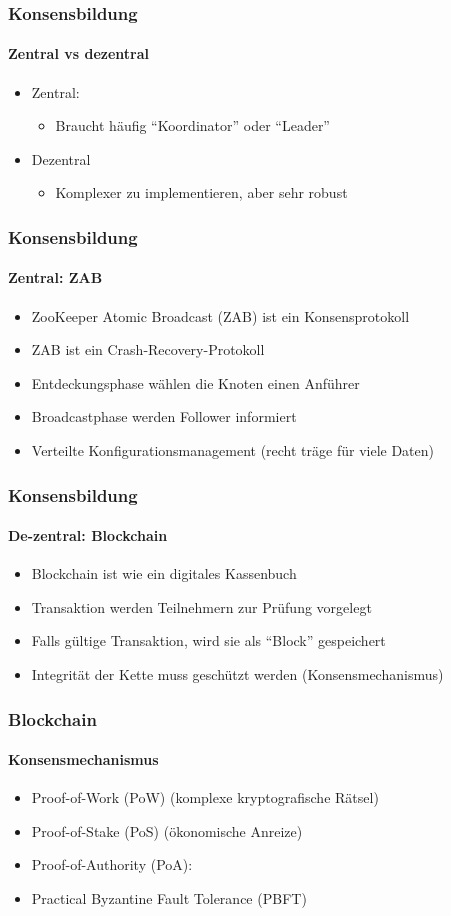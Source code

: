 \begin{frame}
  \frametitle{Konsensbildung}
  \framesubtitle{Zentral vs dezentral}
 \begin{itemize}
  \item Zentral: 
  \begin{itemize}
    \item Braucht häufig \enquote{Koordinator} oder \enquote{Leader} 
   \end{itemize}
   \item Dezentral
    \begin{itemize}
    \item Komplexer zu implementieren, aber sehr robust
   \end{itemize}
  \end{itemize}    
\end{frame}

\begin{frame}
  \frametitle{Konsensbildung}
  \framesubtitle{Zentral: ZAB}
 \begin{itemize}
    \item ZooKeeper Atomic Broadcast (ZAB) ist ein Konsensprotokoll
    \item ZAB ist ein Crash-Recovery-Protokoll
    \item Entdeckungsphase wählen die Knoten einen Anführer
    \item Broadcastphase werden Follower informiert
    \item Verteilte Konfigurationsmanagement (recht träge für viele Daten)
  \end{itemize}    
\end{frame}

\begin{frame}
  \frametitle{Konsensbildung}
  \framesubtitle{De-zentral: Blockchain}
 \begin{itemize}
    \item Blockchain ist wie ein digitales Kassenbuch
    \item Transaktion werden Teilnehmern zur Prüfung vorgelegt
    \item Falls gültige Transaktion, wird sie als \enquote{Block} gespeichert 
    \item Integrität der Kette muss geschützt werden (Konsensmechanismus)
  \end{itemize}    
\end{frame}

\begin{frame}
  \frametitle{Blockchain}
  \framesubtitle{Konsensmechanismus}
 \begin{itemize}
    \item Proof-of-Work (PoW) (komplexe kryptografische Rätsel)
    \item Proof-of-Stake (PoS) (ökonomische Anreize)  
    \item Proof-of-Authority (PoA):
    \item Practical Byzantine Fault Tolerance (PBFT)
  \end{itemize}    
\end{frame}

